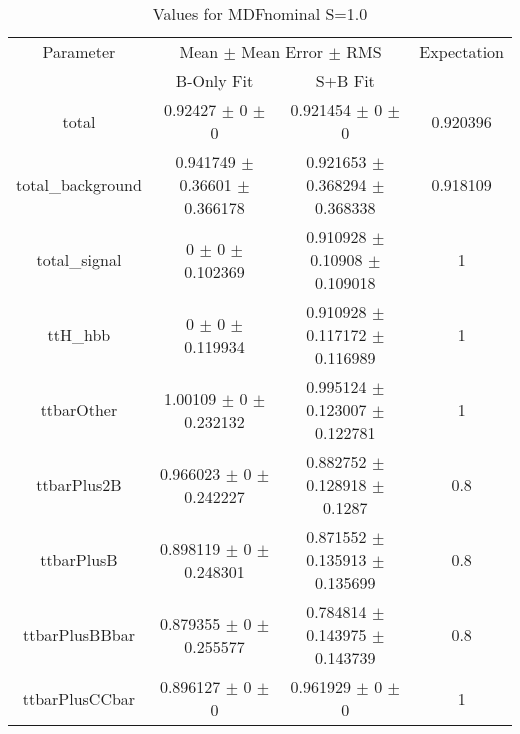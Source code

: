 \begin{table}
\centering
\caption{Values for MDFnominal S=1.0}
\begin{tabular}{cccc}
\toprule
Parameter & \multicolumn{2}{c}{Mean $\pm$ Mean Error $\pm$ RMS} & Expectation\\
 & B-Only Fit & S+B Fit & \\
\midrule
total & \num{0.92427} $\pm$ \num{0} $\pm$ \num{0} & \num{0.921454} $\pm$ \num{0} $\pm$ \num{0} & \num{0.920396}\\
total\_background & \num{0.941749} $\pm$ \num{0.36601} $\pm$ \num{0.366178} & \num{0.921653} $\pm$ \num{0.368294} $\pm$ \num{0.368338} & \num{0.918109}\\
total\_signal & \num{0} $\pm$ \num{0} $\pm$ \num{0.102369} & \num{0.910928} $\pm$ \num{0.10908} $\pm$ \num{0.109018} & \num{1}\\
ttH\_hbb & \num{0} $\pm$ \num{0} $\pm$ \num{0.119934} & \num{0.910928} $\pm$ \num{0.117172} $\pm$ \num{0.116989} & \num{1}\\
ttbarOther & \num{1.00109} $\pm$ \num{0} $\pm$ \num{0.232132} & \num{0.995124} $\pm$ \num{0.123007} $\pm$ \num{0.122781} & \num{1}\\
ttbarPlus2B & \num{0.966023} $\pm$ \num{0} $\pm$ \num{0.242227} & \num{0.882752} $\pm$ \num{0.128918} $\pm$ \num{0.1287} & \num{0.8}\\
ttbarPlusB & \num{0.898119} $\pm$ \num{0} $\pm$ \num{0.248301} & \num{0.871552} $\pm$ \num{0.135913} $\pm$ \num{0.135699} & \num{0.8}\\
ttbarPlusBBbar & \num{0.879355} $\pm$ \num{0} $\pm$ \num{0.255577} & \num{0.784814} $\pm$ \num{0.143975} $\pm$ \num{0.143739} & \num{0.8}\\
ttbarPlusCCbar & \num{0.896127} $\pm$ \num{0} $\pm$ \num{0} & \num{0.961929} $\pm$ \num{0} $\pm$ \num{0} & \num{1}\\
\bottomrule
\end{tabular}
\end{table}